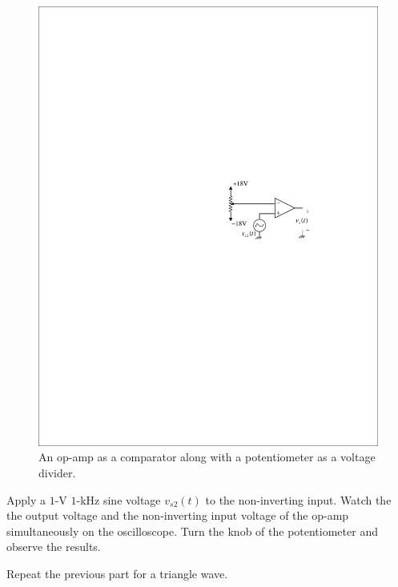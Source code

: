 \documentclass[11pt]{article}
\begin{document}
\begin{question}


    \begin{figure}[H]
        \centering
        \includegraphics[scale=1.2,angle=0]{Fig/cir2.pdf}
        \caption{An op-amp as a comparator along with a potentiometer as a voltage divider.} \label{fig:cir2}
    \end{figure}

    \begin{subquestion}{Apply a $1$-V $1$-kHz sine voltage $v_{s2}(t)$ to the non-inverting input. Watch the the output voltage and the non-inverting input voltage of the op-amp simultaneously on the oscilloscope. Turn the knob of the potentiometer and observe the results.}
        \answer{}
    \end{subquestion}

    \begin{subquestion}{Repeat the previous part for a triangle wave.}
        \answer{}
    \end{subquestion}


\end{question}
\end{document}

